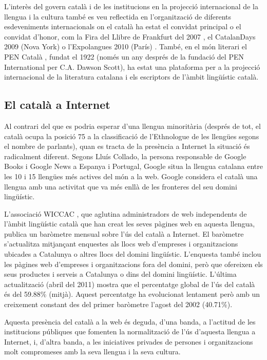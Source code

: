 \begin{multicols}{2}
L’interès del govern català i de les institucions en la projecció internacional de la llengua i la cultura també es veu reflectida en l’organització de diferents esdeveniments internacionals on el català ha estat el convidat principal o el convidat d’honor, com la Fira del Llibre de Frankfurt del 2007 \cite{CAT-Nota13}, el CatalanDays 2009 (Nova York) \cite{CAT-Nota14} o l’Expolangues 2010 (París) \cite{CAT-Nota15}. També, en el món literari el PEN Català \cite{CAT-Nota16}, fundat el 1922 (només un any després de la fundació del PEN International per C.A. Dawson Scott), ha estat una plataforma per a la projecció internacional de la literatura catalana i els escriptors de l’àmbit lingüístic català.

\subsection{El català a Internet}

 Al contrari del que es podria esperar d’una llengua minoritària (després de tot, el català ocupa la posició 75 a la classificació de l’Ethnologue \cite{CAT-Nota17} de les llengües segons el nombre de parlants), quan es tracta de la presència a Internet la situació és radicalment diferent. Segons Lluís Collado, la persona responsable de Google Books i Google News a Espanya i Portugal, Google situa la llengua catalana entre les 10 i 15 llengües més actives del món a la web. Google considera el català una llengua amb una activitat que va més enllà de les fronteres del seu domini lingüístic.  

L’associació WICCAC \cite{CAT-Nota18}, que aglutina administradors de web independents de l’àmbit lingüístic català que han creat les seves pàgines web en aquesta llengua, publica un baròmetre mensual sobre l’ús del català a Internet. El baròmetre s’actualitza mitjançant enquestes als llocs web d’empreses i organitzacions ubicades a Catalunya o altres llocs del domini lingüístic. L’enquesta també inclou les pàgines web d’empreses i organitzacions fora del domini, però que ofereixen els seus productes i serveis a Catalunya o dins del domini lingüístic. L’última actualització (abril del 2011) mostra que el percentatge global de l’ús del català és del 59.88\% (mitjà). Aquest percentatge ha evolucionat lentament però amb un creixement constant des del primer baròmetre l’agost del 2002 (40.71\%).

Aquesta presència del català a la web és deguda, d’una banda, a l’actitud de les institucions públiques que fomenten la normalització de l’ús d’aquesta llengua a Internet, i, d’altra banda, a les iniciatives privades de persones i organitzacions molt compromeses amb la seva llengua i la seva cultura.


\end{multicols}
